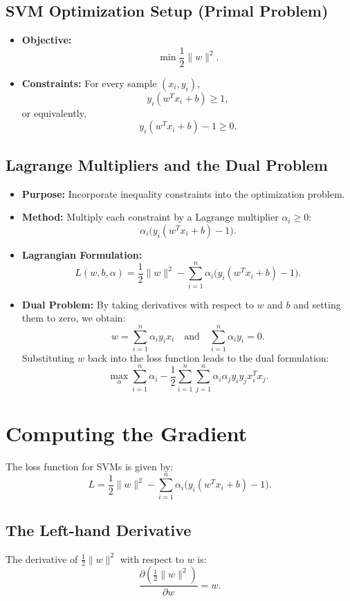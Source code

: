 \documentclass[11pt]{article}
\begin{document}
\subsection{SVM Optimization Setup (Primal Problem)}
\begin{itemize}
    \item \textbf{Objective:}
    \[
    \min \frac{1}{2}\|w\|^2.
    \]
    \item \textbf{Constraints:} For every sample \((x_i, y_i)\),
    \[
    y_i (w^T x_i + b) \geq 1,
    \]
    or equivalently,
    \[
    y_i (w^T x_i + b) - 1 \geq 0.
    \]
\end{itemize}

\subsection{Lagrange Multipliers and the Dual Problem}
\begin{itemize}
    \item \textbf{Purpose:} Incorporate inequality constraints into the optimization problem.
    \item \textbf{Method:} Multiply each constraint by a Lagrange multiplier \(\alpha_i \geq 0\):
    \[
    \alpha_i \bigl( y_i (w^T x_i + b) - 1 \bigr).
    \]
    \item \textbf{Lagrangian Formulation:}
    \[
    L(w, b, \alpha) = \frac{1}{2}\|w\|^2 - \sum_{i=1}^{n} \alpha_i \bigl( y_i (w^T x_i + b) - 1 \bigr).
    \]
    \item \textbf{Dual Problem:} By taking derivatives with respect to \(w\) and \(b\) and setting them to zero, we obtain:
    \[
    w = \sum_{i=1}^{n} \alpha_i y_i x_i \quad \text{and} \quad \sum_{i=1}^{n} \alpha_i y_i = 0.
    \]
    Substituting \(w\) back into the loss function leads to the dual formulation:
    \[
    \max_{\alpha} \sum_{i=1}^{n} \alpha_i - \frac{1}{2} \sum_{i=1}^{n} \sum_{j=1}^{n} \alpha_i \alpha_j y_i y_j x_i^T x_j.
    \]
\end{itemize}

\section{Computing the Gradient}

The loss function for SVMs is given by:
\[
L = \frac{1}{2}\|w\|^2 - \sum_{i=1}^{n} \alpha_i \bigl( y_i (w^T x_i + b) - 1 \bigr).
\]

\subsection{The Left-hand Derivative}
The derivative of \(\frac{1}{2}\|w\|^2\) with respect to \(w\) is:
\[
\frac{\partial \left(\frac{1}{2}\|w\|^2\right)}{\partial w} = w.
\]
\end{document}
